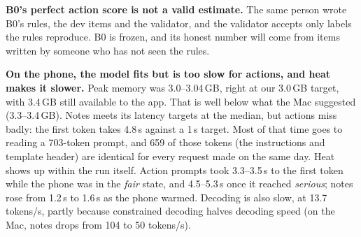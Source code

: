 \documentclass[10pt,letterpaper]{article}
\begin{document}
\textbf{B0's perfect action score is not a valid estimate.} The same person wrote B0's rules, the dev items and the validator, and the validator accepts only labels the rules reproduce. B0 is frozen, and its honest number will come from items written by someone who has not seen the rules.

\textbf{On the phone, the model fits but is too slow for actions, and heat makes it slower.} Peak memory was 3.0--3.04\,GB, right at our 3.0\,GB target, with 3.4\,GB still available to the app. That is well below what the Mac suggested (3.3--3.4\,GB). Notes meets its latency targets at the median, but actions miss badly: the first token takes 4.8\,s against a 1\,s target. Most of that time goes to reading a 703-token prompt, and 659 of those tokens (the instructions and template header) are identical for every request made on the same day. Heat shows up within the run itself. Action prompts took 3.3--3.5\,s to the first token while the phone was in the \emph{fair} state, and 4.5--5.3\,s once it reached \emph{serious}; notes rose from 1.2\,s to 1.6\,s as the phone warmed. Decoding is also slow, at 13.7 tokens/s, partly because constrained decoding halves decoding speed (on the Mac, notes drops from 104 to 50 tokens/s).
\end{document}
